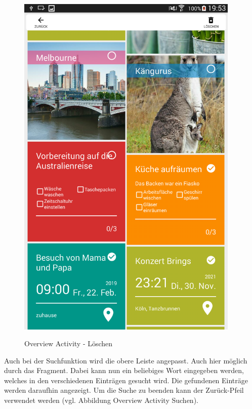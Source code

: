 \begin{figure}[H]
\centering
\begin{minipage}[t]{1\textwidth} %
\caption{Overview Activity - Löschen} %
\includegraphics[height=17cm]{img/Loeschen}\\ %
\end{minipage}
\end{figure}

Auch bei der Suchfunktion wird die obere Leiste angepasst. Auch hier möglich durch das Fragment. Dabei kann nun ein beliebiges Wort eingegeben werden, welches in den verschiedenen Einträgen gesucht wird. Die gefundenen Einträge werden daraufhin angezeigt. Um die Suche zu beenden kann der Zurück-Pfeil verwendet werden (vgl. Abbildung Overview Activity Suchen).

